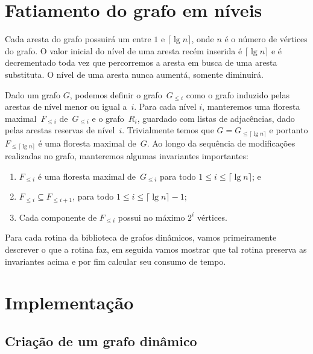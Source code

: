\section{Fatiamento do grafo em níveis}
Cada aresta do grafo possuirá um  entre $1$ e $\lceil \lg n \rceil$, onde $n$ é o número de vértices do grafo. O valor inicial do nível de uma aresta recém inserida é $\lceil \lg n \rceil$ e é decrementado toda vez que percorremos a aresta em busca de uma aresta substituta. O nível de uma aresta nunca aumentá, somente diminuirá. 

Dado um grafo $G$, podemos definir o grafo~$G_{\leqslant i}$ como o grafo induzido pelas arestas de nível menor ou igual a~$i$. Para cada nível $i$, manteremos uma floresta maximal~$F_{\leqslant i}$ de~$G_{\leqslant i}$ e o grafo~$R_i$, guardado com listas de adjacências, dado pelas arestas reservas de nível~$i$. Trivialmente temos que $G = G_{\leqslant \lceil \lg n \rceil}$ e portanto $F_{\leqslant \lceil \lg n \rceil}$ é uma floresta maximal de~$G$. Ao longo da sequência de modificações realizadas no grafo, manteremos algumas invariantes importantes:
\begin{enumerate}[label=(\roman*)]
    \item $F_{\leqslant i}$ é uma floresta maximal de~$G_{\leqslant i}$ para todo $1\leqslant i \leqslant \lceil \lg n \rceil$; e\label{invar:SF}
    \item $F_{\leqslant i}\subseteq F_{\leqslant i+1}$, para todo $1\leqslant i \leqslant \lceil \lg n \rceil-1$; \label{invar:contida}
    \item Cada componente de $F_{\leqslant i}$ possui no máximo $2^i$ vértices.\label{invar:tamanho}
\end{enumerate}

Para cada rotina da biblioteca de grafos dinâmicos, vamos primeiramente descrever o que a rotina faz, em seguida vamos mostrar que tal rotina preserva as invariantes acima e por fim calcular seu consumo de tempo.

\section{Implementação}
\subsection{Criação de um grafo dinâmico}


